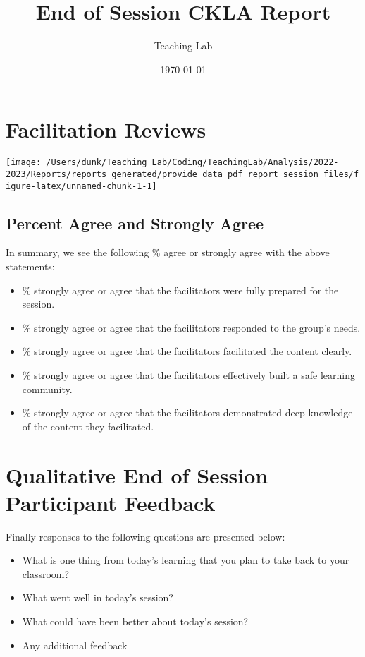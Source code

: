 \documentclass[10,a4paperpaper,]{article}
\title{End of Session CKLA Report}
\author{Teaching Lab}
\date{\today}
\begin{document}
\renewcommand{\contentsname}{Table of Contents}

\renewcommand{\pagename}{Page}


\maketitle
\tableofcontents
{}

\section{Facilitation Reviews}

\begin{center}\texttt{[image: /Users/dunk/Teaching Lab/Coding/TeachingLab/Analysis/2022-2023/Reports/reports\_generated/provide\_data\_pdf\_report\_session\_files/figure-latex/unnamed-chunk-1-1]} \end{center}

\subsection{Percent Agree and Strongly Agree}

In summary, we see the following \% agree or strongly agree with the
above statements:

\begin{itemize}
\tightlist
\item
  \% strongly agree or agree that the facilitators were fully prepared
  for the session.
\item
  \% strongly agree or agree that the facilitators responded to the
  group's needs.
\item
  \% strongly agree or agree that the facilitators facilitated the
  content clearly.
\item
  \% strongly agree or agree that the facilitators effectively built a
  safe learning community.
\item
  \% strongly agree or agree that the facilitators demonstrated deep
  knowledge of the content they facilitated.
\end{itemize}

\section{Qualitative End of Session Participant Feedback}

Finally responses to the following questions are presented below:

\begin{itemize}
\item
  What is one thing from today's learning that you plan to take back to
  your classroom?
\item
  What went well in today's session?
\item
  What could have been better about today's session?
\item
  Any additional feedback
\end{itemize}
\end{document}
